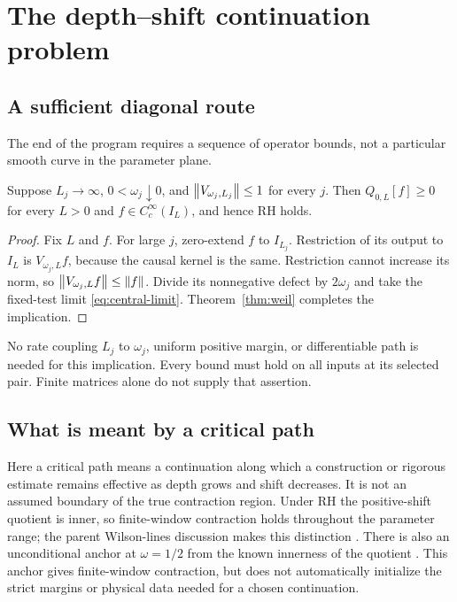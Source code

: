 \section{The depth--shift continuation problem}\label{sec:path}

\subsection{A sufficient diagonal route}

The end of the program requires a sequence of operator bounds,
not a particular smooth curve in the parameter plane.

\begin{proposition}\label{prop:diagonal}
Suppose $L_j\to\infty$, $0<\omega_j\downarrow0$, and
$\left\lVert V_{\omega_j,L_j}\right\rVert\leq1$ for every $j$.
Then $Q_{0,L}[f]\geq0$ for every $L>0$ and
$f\in C_c^\infty(I_L)$, and hence RH holds.
\end{proposition}
\begin{proof}
Fix $L$ and $f$. For large $j$, zero-extend $f$ to $I_{L_j}$.
Restriction of its output to $I_L$ is $V_{\omega_j,L}f$,
because the causal kernel is the same. Restriction cannot
increase its norm, so
$\left\lVert V_{\omega_j,L}f\right\rVert\leq\left\lVert f\right\rVert$.
Divide its nonnegative defect by $2\omega_j$ and take the fixed-test
limit \eqref{eq:central-limit}. Theorem~\ref{thm:weil} completes
the implication.
\end{proof}

No rate coupling $L_j$ to $\omega_j$, uniform positive margin,
or differentiable path is needed for this implication. Every
bound must hold on all inputs at its selected pair.
Finite matrices alone do not supply that assertion.

\subsection{What is meant by a critical path}

Here a critical path means a continuation along which a
construction or rigorous estimate remains effective as depth grows
and shift decreases. It is not an assumed boundary of the true
contraction region. Under RH the positive-shift quotient is inner,
so finite-window contraction holds throughout the parameter range;
the parent Wilson-lines discussion makes this distinction
\cite{ParentWilson}. There is also an unconditional anchor at
$\omega=1/2$ from the known innerness of the quotient
\cite[Section~1.4]{Suzuki2012}. This anchor gives finite-window
contraction, but does not automatically initialize the strict
margins or physical data needed for a chosen continuation.

